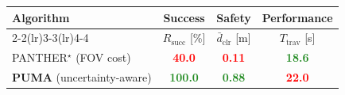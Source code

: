 \documentclass[border=16pt,varwidth=20cm]{standalone}
\newcommand{\best}[1]{\textbf{\textcolor{ForestGreen}{#1}}}
\newcommand{\worst}[1]{\textbf{\textcolor{red}{#1}}}
\begin{document}
\centering
\begin{tabular}{l c c c}
\toprule
\multirow{2}{*}[-0.4ex]{\textbf{Algorithm}}
 & \textbf{Success}
 & \textbf{Safety}
 & \textbf{Performance} \\
\cmidrule(lr){2-2}\cmidrule(lr){3-3}\cmidrule(lr){4-4}
 & $R_{\mathrm{succ}}$ [\%]
 & $\bar{d}_{\mathrm{clr}}$ [m]
 & $T_{\mathrm{trav}}$ [s] \\
\midrule
PANTHER$^{\star}$ (FOV cost)        & \worst{40.0}  & \worst{0.11} & \best{18.6}  \\
\textbf{PUMA} (uncertainty-aware)   & \best{100.0}  & \best{0.88}  & \worst{22.0} \\
\bottomrule
\end{tabular}
\end{document}
